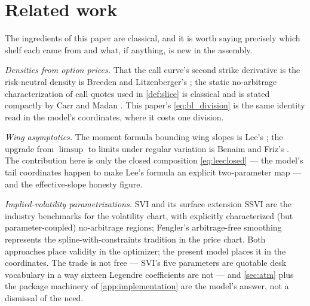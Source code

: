 \section{Related work}
\label{sec:related}

The ingredients of this paper are classical, and it is worth saying
precisely which shelf each came from and what, if anything, is new in
the assembly.

\emph{Densities from option prices.}  That the call curve's second
strike derivative is the risk-neutral density is Breeden and
Litzenberger's \citep{BreedenLitzenberger1978}; the static no-arbitrage
characterization of call quotes used in \cref{def:slice} is classical
and is stated compactly by Carr and Madan \citep{CarrMadan2005}.  This
paper's \eqref{eq:bl_division} is the same identity read in the model's
coordinates, where it costs one division.

\emph{Wing asymptotics.}  The moment formula bounding wing slopes is
Lee's \citep{Lee2004}; the upgrade from $\limsup$ to limits under
regular variation is Benaim and Friz's \citep{BenaimFriz2009}.  The
contribution here is only the closed composition
\eqref{eq:leeclosed} --- the model's tail coordinates happen to make
Lee's formula an explicit two-parameter map --- and the effective-slope
honesty figure.

\emph{Implied-volatility parametrizations.}  SVI
\citep{Gatheral2004} and its surface extension SSVI
\citep{GatheralJacquier2014} are the industry benchmarks for the
volatility chart, with explicitly characterized (but parameter-coupled)
no-arbitrage regions; Fengler's arbitrage-free smoothing
\citep{Fengler2009} represents the spline-with-constraints tradition in
the price chart.  Both approaches place validity in the optimizer;
the present model places it in the coordinates.  The trade is not free
--- SVI's five parameters are quotable desk vocabulary in a way sixteen
Legendre coefficients are not --- and \cref{sec:atm} plus the package
machinery of \cref{app:implementation} are the model's answer, not a
dismissal of the need.

